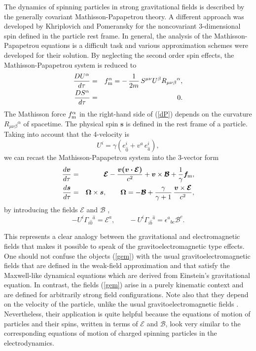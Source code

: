 \documentclass[preprint,showpacs,preprintnumbers,eqsecnum,amsmath,amssymb]{revtex4}
\begin{document}
The dynamics of spinning particles in strong gravitational fields
is described by the generally covariant Mathisson-Papapetrou
\cite{Mathisson,Papapetrou} theory. A different approach was
developed by Khriplovich and Pomeransky \cite{PK} for the
noncovariant 3-dimensional spin defined in the particle rest
frame. In general, the analysis of the Mathisson-Papapetrou
equations is a difficult task and various approximation schemes
were developed for their solution. By neglecting the second order
spin effects, the Mathisson-Papapetrou system is reduced to
\cite{chicone}
\begin{eqnarray}\label{dP}
{\frac {DU^\alpha}{d\tau}} &=& f_{\rm m}^\alpha = -\,{\frac 1{2m}}
\,S^{\mu\nu}U^\beta R_{\mu\nu\beta}{}^\alpha,\\
{\frac {DS^\alpha}{d\tau}} &=& 0.\label{dS}
\end{eqnarray}
The Mathisson force $f_{\rm m}^\alpha$ in the right-hand side of
(\ref{dP}) depends on the curvature $R_{\mu\nu\beta}{}^\alpha$ of
spacetime. The physical spin $\bm{s}$ is defined in the rest frame
of a particle. Taking into account that the 4-velocity is
\begin{equation}
U^i = \gamma (e^i_{\widehat 0}+ v^a\,e^i_{\widehat a}),\label{UGadd}
\end{equation}
we can recast the Mathisson-Papapetrou system into the 3-vector form
\begin{eqnarray}
{\frac {d\bm{v}}{d\tau}} &=& \bm{\mathcal{E}} - {\frac {\bm{
\bm{v}(\bm{v}\cdot\bm{\mathcal{E}})}} {c^2}} +
\bm{v}\times\bm{\mathcal{B}} + {\frac 1\gamma}\bm{f}_{\rm m},\label{force}\\
{\frac {d{\bm s}}{d\tau}} &=& \bm\Omega\times\bm s,\qquad
\bm{\Omega} = -\bm{\mathcal{B}} + {\frac {\gamma}{\gamma +
1}}\,{\frac {\bm{v} \times\bm{\mathcal{E}}} {c^2}},\label{omgem}
\end{eqnarray}
by introducing the fields $\bm{\mathcal E}$ and $\bm{\mathcal B}$ \cite{PK},
\begin{equation}\label{gem}
- U^i\Gamma_{i\widehat{0}}{}^{\widehat{a}} = {\mathcal E}^a,\qquad
- U^i\Gamma_{i\widehat{b}}{}^{\widehat{a}} = \epsilon^a{}_{bc}{\mathcal B}^c.
\end{equation}

This represents a clear analogy between the gravitational and
electromagnetic fields that makes it possible to speak of the
gravitoelectromagnetic type effects. One should not confuse the
objects (\ref{gem}) with the usual gravitoelectromagnetic fields
\cite{gem1,gem2} that are defined in the weak-field approximation
and that satisfy the Maxwell-like dynamical equations which are
derived from Einstein's gravitational equation. In contrast, the
fields (\ref{gem}) arise in a purely kinematic context and are
defined for arbitrarily strong field configurations. Note also
that they depend on the velocity of the particle, unlike the usual
gravitoelectromagnetic fields \cite{gem1,gem2}. Nevertheless,
their application is quite helpful because the equations of motion
of particles and their spins, written in terms of $\bm{\mathcal
E}$ and $\bm{\mathcal B}$, look very similar to the corresponding
equations of motion of charged spinning particles in the
electrodynamics.
\end{document}
